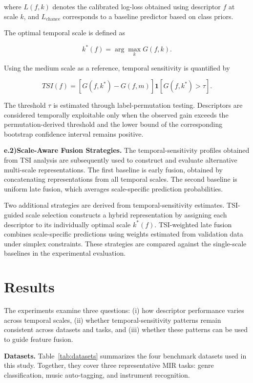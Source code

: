 \documentclass[runningheads]{llncs}
\begin{document}
\noindent where $L(f,k)$ denotes the calibrated log-loss obtained using descriptor $f$ at scale $k$, and $L_{\mathrm{chance}}$ corresponds to a baseline predictor based on class priors.

The optimal temporal scale is defined as

\begin{equation}
k^*(f)=\arg\max_k G(f,k).
\end{equation}

Using the medium scale as a reference, temporal sensitivity is quantified by

\begin{equation}
TSI(f)=
\left[
G(f,k^*)-G(f,m)
\right]
\mathbf{1}[G(f,k^*)>\tau].
\end{equation}

The threshold $\tau$ is estimated through label-permutation testing. Descriptors are considered temporally exploitable only when the observed gain exceeds the permutation-derived threshold and the lower bound of the corresponding bootstrap confidence interval remains positive.

\textbf{e.2)Scale-Aware Fusion Strategies.} The temporal-sensitivity profiles obtained from TSI analysis are subsequently used to construct and evaluate alternative multi-scale representations. The first baseline is early fusion, obtained by concatenating representations from all temporal scales. The second baseline is uniform late fusion, which averages scale-specific prediction probabilities.

Two additional strategies are derived from temporal-sensitivity estimates. TSI-guided scale selection constructs a hybrid representation by assigning each descriptor to its individually optimal scale $k^*(f)$. TSI-weighted late fusion combines scale-specific predictions using weights estimated from validation data under simplex constraints. These strategies are compared against the single-scale baselines in the experimental evaluation.

\section{Results}
The experiments examine three questions: (i) how descriptor performance varies across temporal scales, (ii) whether temporal-sensitivity patterns remain consistent across datasets and tasks, and (iii) whether these patterns can be used to guide feature fusion.

\textbf{Datasets.} Table~\ref{tab:datasets} summarizes the four benchmark datasets used in this study. Together, they cover three representative MIR tasks: genre classification, music auto-tagging, and instrument recognition.
\end{document}
